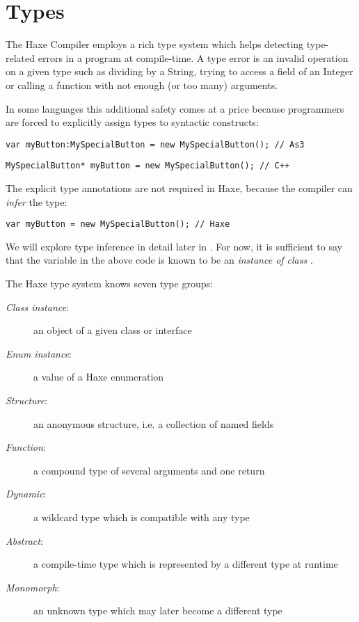 \chapter{Types}
\label{types}

The Haxe Compiler employs a rich type system which helps detecting type-related errors in a program at compile-time. A type error is an invalid operation on a given type such as dividing by a String, trying to access a field of an Integer or calling a function with not enough (or too many) arguments.

In some languages this additional safety comes at a price because programmers are forced to explicitly assign types to syntactic constructs:

\begin{lstlisting}
var myButton:MySpecialButton = new MySpecialButton(); // As3
\end{lstlisting}
\begin{lstlisting}
MySpecialButton* myButton = new MySpecialButton(); // C++ 
\end{lstlisting}
The explicit type annotations are not required in Haxe, because the compiler can \emph{infer} the type:

\begin{lstlisting}
var myButton = new MySpecialButton(); // Haxe
\end{lstlisting}
We will explore type inference in detail later in . For now, it is sufficient to say that the variable  in the above code is known to be an \emph{instance of class} . 

The Haxe type system knows seven type groups:

\begin{description}
 \item[\emph{Class instance}:] an object of a given class or interface
 \item[\emph{Enum instance}:] a value of a Haxe enumeration
 \item[\emph{Structure}:] an anonymous structure, i.e. a collection of named fields
 \item[\emph{Function}:] a compound type of several arguments and one return
 \item[\emph{Dynamic}:] a wildcard type which is compatible with any type
 \item[\emph{Abstract}:] a compile-time type which is represented by a different type at runtime
 \item[\emph{Monomorph}:] an unknown type which may later become a different type
\end{description}

